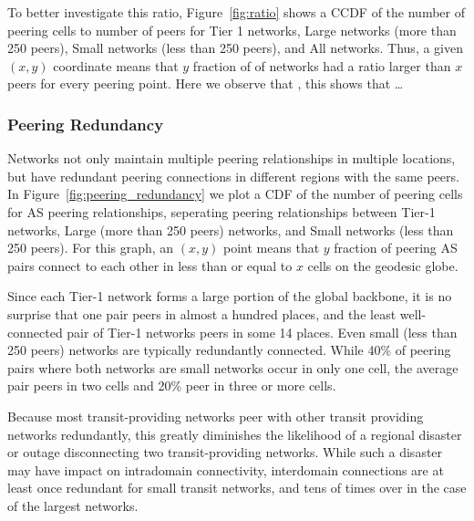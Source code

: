     To better investigate this ratio, Figure~\ref{fig:ratio} shows a CCDF of the number of peering cells to number of peers for Tier 1 networks, Large networks (more than 250 peers), Small networks (less than 250 peers), and All networks. 
    Thus, a given $(x,y)$ coordinate means that $y$ fraction of of networks had a ratio larger than $x$ peers for every peering point.
    Here we observe that \justine{\ldots}, this shows that \ldots

\subsubsection*{Peering Redundancy}
    Networks not only maintain multiple peering relationships in multiple locations, but have redundant peering connections in different regions with the same peers.
    In Figure~\ref{fig:peering_redundancy} we plot a CDF of the number of peering cells for AS peering relationships, seperating peering relationships between Tier-1 networks, Large (more than 250 peers) networks, and Small networks (less than 250 peers).
    For this graph, an $(x,y)$ point means that $y$ fraction of peering AS pairs connect to each other in less than or equal to $x$ cells on the geodesic globe.

    Since each Tier-1 network forms a large portion of the global backbone, it is no surprise that one pair peers in almost a hundred places, and the least well-connected pair of Tier-1 networks peers in some 14 places.
    Even small (less than 250 peers) networks are typically redundantly connected. 
    While 40\% of peering pairs where both networks are small networks occur in only one cell, the average pair peers in two cells and 20\% peer in three or more cells. 

    Because most transit-providing networks peer with other transit providing networks redundantly, this greatly diminishes the likelihood of a regional disaster or outage disconnecting two transit-providing networks.
    While such a disaster may have impact on intradomain connectivity, interdomain connections are at least once redundant for small transit networks, and tens of times over in the case of the largest networks.

